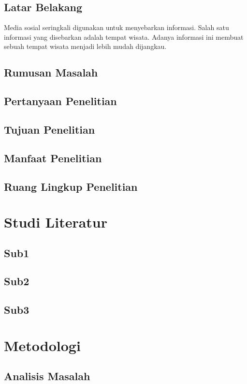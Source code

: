 \documentclass{article}
\begin{document}
\subsection{Latar Belakang}
    Media sosial seringkali digunakan untuk menyebarkan informasi.
    Salah satu informasi yang disebarkan adalah tempat wisata.
    Adanya informasi ini membuat sebuah tempat wisata menjadi lebih mudah dijangkau.
\subsection{Rumusan Masalah}
    
\subsection{Pertanyaan Penelitian}
\subsection{Tujuan Penelitian}
\subsection{Manfaat Penelitian}
\subsection{Ruang Lingkup Penelitian}
\newpage


\section{Studi Literatur}
\subsection{Sub1}
\subsection{Sub2}
\subsection{Sub3}
\newpage


\section{Metodologi}
\subsection{Analisis Masalah}
\end{document}
